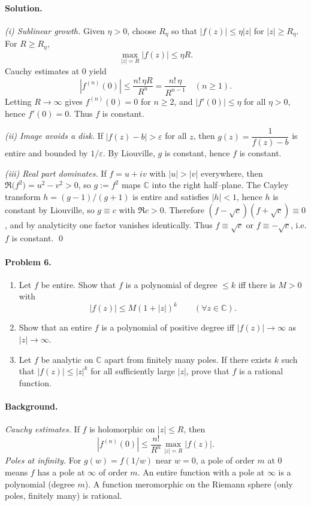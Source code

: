 \documentclass[11pt,a4paper]{article}
\theoremstyle{definition}
\theoremstyle{definition}
\theoremstyle{plain}
\theoremstyle{remark}
\begin{document}
\paragraph{Solution.}

\emph{(i) Sublinear growth.}
Given $\eta>0$, choose $R_\eta$ so that $|f(z)|\le \eta|z|$ for $|z|\ge R_\eta$.
For $R\ge R_\eta$,
\[
\max_{|z|=R}|f(z)|\le \eta R.
\]
Cauchy estimates at $0$ yield
\[
|f^{(n)}(0)|\le \frac{n!\,\eta R}{R^n}=\frac{n!\,\eta}{R^{n-1}}\quad(n\ge 1).
\]
Letting $R\to\infty$ gives $f^{(n)}(0)=0$ for $n\ge 2$, and $|f'(0)|\le \eta$ for all $\eta>0$, hence $f'(0)=0$.
Thus $f$ is constant.

\medskip
\emph{(ii) Image avoids a disk.}
If $|f(z)-b|>\varepsilon$ for all $z$, then $g(z)=\dfrac{1}{f(z)-b}$ is entire and bounded by $1/\varepsilon$.
By Liouville, $g$ is constant, hence $f$ is constant.

\medskip
\emph{(iii) Real part dominates.}
If $f=u+iv$ with $|u|>|v|$ everywhere, then $\Re\big(f^2\big)=u^2-v^2>0$, so $g:=f^2$ maps $\mathbb C$ into the right half–plane.
The Cayley transform $h=(g-1)/(g+1)$ is entire and satisfies $|h|<1$, hence $h$ is constant by Liouville, so $g\equiv c$ with $\Re c>0$.
Therefore $(f-\sqrt c)(f+\sqrt c)\equiv 0$, and by analyticity one factor vanishes identically.
Thus $f\equiv \sqrt c$ or $f\equiv -\sqrt c$, i.e. $f$ is constant.
\qed

\paragraph{Problem 6.}
\begin{enumerate}[label=(\roman*)]
	\item Let $f$ be entire. Show that $f$ is a polynomial of degree $\le k$ iff there is $M>0$ with
	\[
	|f(z)|\le M(1+|z|)^k\qquad(\forall z\in\mathbb C).
	\]
	\item Show that an entire $f$ is a polynomial of positive degree iff $|f(z)|\to\infty$ as $|z|\to\infty$.
	\item Let $f$ be analytic on $\mathbb C$ apart from finitely many poles. If there exists $k$ such that
	$|f(z)|\le |z|^k$ for all sufficiently large $|z|$, prove that $f$ is a rational function.
\end{enumerate}

\paragraph{Background.}
\emph{Cauchy estimates.} If $f$ is holomorphic on $|z|\le R$, then
\[
|f^{(n)}(0)|\le \frac{n!}{R^n}\max_{|z|=R}|f(z)|.
\]
\emph{Poles at infinity.} For $g(w)=f(1/w)$ near $w=0$, a pole of order $m$ at $0$ means $f$ has a pole at $\infty$ of order $m$. An entire function with a pole at $\infty$ is a polynomial (degree $m$). A function meromorphic on the Riemann sphere (only poles, finitely many) is rational.
\end{document}
